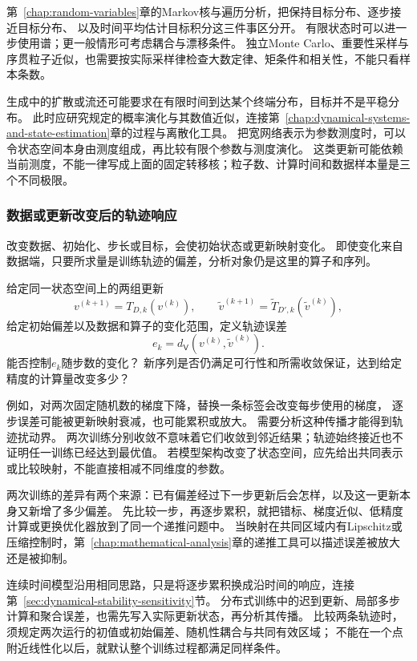 第~\ref{chap:random-variables}章的Markov核与遍历分析，把保持目标分布、逐步接近目标分布、
以及时间平均估计目标积分这三件事区分开。
有限状态时可以进一步使用谱；更一般情形可考虑耦合与漂移条件。
独立Monte Carlo、重要性采样与序贯粒子近似，也需要按实际采样律检查大数定律、矩条件和相关性，不能只看样本条数。

生成中的扩散或流还可能要求在有限时间到达某个终端分布，目标并不是平稳分布。
此时应研究规定的概率演化与其数值近似，连接第~\ref{chap:dynamical-systems-and-state-estimation}章的过程与离散化工具。
把宽网络表示为参数测度时，可以令状态空间本身由测度组成，再比较有限个参数与测度演化。
这类更新可能依赖当前测度，不能一律写成上面的固定转移核；粒子数、计算时间和数据样本量是三个不同极限。

\subsubsection{数据或更新改变后的轨迹响应}
\label{sec:future-analysis-iteration-perturbation}

改变数据、初始化、步长或目标，会使初始状态或更新映射变化。
即使变化来自数据端，只要所求量是训练轨迹的偏差，分析对象仍是这里的算子和序列。

\begin{mathproblem}[迭代轨迹对数据和更新规则的响应]
  \label{question:future-iteration-perturbation}
  给定同一状态空间上的两组更新
  \[
    v^{(k+1)}=T_{D,k}(v^{(k)}),\qquad
    \widetilde v^{(k+1)}=\widetilde T_{D',k}(\widetilde v^{(k)}),
  \]
  给定初始偏差以及数据和算子的变化范围，定义轨迹误差
  \[
    e_k=d_{\mathsf V}(v^{(k)},\widetilde v^{(k)}).
  \]
  能否控制$e_k$随步数的变化？
  新序列是否仍满足可行性和所需收敛保证，达到给定精度的计算量改变多少？
\end{mathproblem}

例如，对两次固定随机数的梯度下降，替换一条标签会改变每步使用的梯度，
逐步误差可能被更新映射衰减，也可能累积或放大。
需要分析这种传播才能得到轨迹扰动界。
两次训练分别收敛不意味着它们收敛到邻近结果；轨迹始终接近也不证明任一训练已经达到最优值。
若模型架构改变了状态空间，应先给出共同表示或比较映射，不能直接相减不同维度的参数。

两次训练的差异有两个来源：已有偏差经过下一步更新后会怎样，以及这一更新本身又新增了多少偏差。
先比较一步，再逐步累积，就把错标、梯度近似、低精度计算或更换优化器放到了同一个递推问题中。
当映射在共同区域内有Lipschitz或压缩控制时，第~\ref{chap:mathematical-analysis}章的递推工具可以描述误差被放大还是被抑制。

连续时间模型沿用相同思路，只是将逐步累积换成沿时间的响应，连接第~\ref{sec:dynamical-stability-sensitivity}节。
分布式训练中的迟到更新、局部多步计算和聚合误差，也需先写入实际更新状态，再分析其传播。
比较两条轨迹时，须规定两次运行的初值或初始偏差、随机性耦合与共同有效区域；
不能在一个点附近线性化以后，就默认整个训练过程都满足同样条件。

